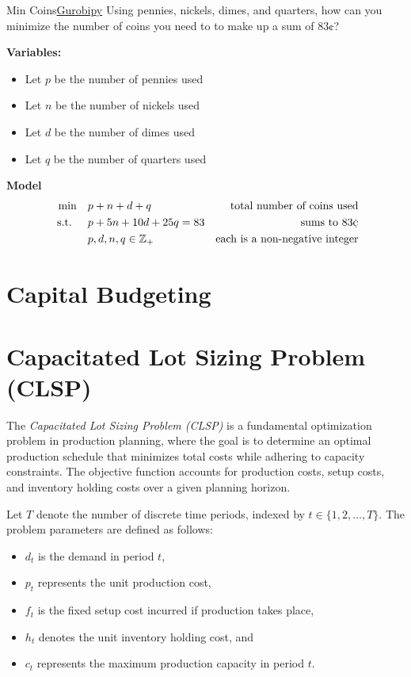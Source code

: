 \begin{examplewithcode}{Min Coins}{\href{https://github.com/open-optimization/open-optimization-or-examples/blob/master/integer-programming/coins-minimize-problem.ipynb}{Gurobipy}}
\label{ex:min-coins}
Using pennies, nickels, dimes, and quarters, how can you minimize the number of coins you need to to make up a sum of $83\cent$? 

\textbf{Variables:}
\begin{itemize}
\item Let $p$ be the number of pennies used
\item Let $n$ be the number of nickels used
\item Let $d$ be the number of dimes used
\item Let $q$ be the number of quarters used
\end{itemize}
\textbf{Model}
\begin{align*}
\min \quad & p + n + d + q & \text{ total number of coins used}\\
\text{ s.t. } \quad & p + 5n + 10d + 25 q = 83 & \text{sums to } 83 \cent\\
& p,d,n,q \in \Z_+ & \text{each is a non-negative integer}
\end{align*}
\end{examplewithcode}

\section{Capital Budgeting}
\todoSection{}



\section{Capacitated Lot Sizing Problem (CLSP)}

The \textit{Capacitated Lot Sizing Problem (CLSP)} is a fundamental optimization problem in production planning, where the goal is to determine an optimal production schedule that minimizes total costs while adhering to capacity constraints. The objective function accounts for production costs, setup costs, and inventory holding costs over a given planning horizon.

Let \( T \) denote the number of discrete time periods, indexed by \( t \in \{1,2,\dots,T\} \). The problem parameters are defined as follows:
\begin{itemize}
    \item \( d_t \) is the demand in period \( t \),
    \item \( p_t \) represents the unit production cost,
    \item \( f_t \) is the fixed setup cost incurred if production takes place,
    \item \( h_t \) denotes the unit inventory holding cost, and
    \item \( c_t \) represents the maximum production capacity in period \( t \).
\end{itemize}

